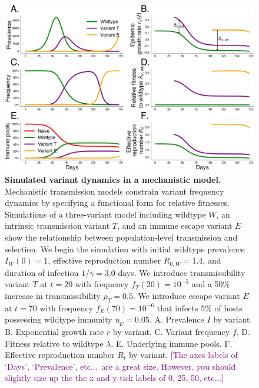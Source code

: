 \documentclass[11pt,oneside,letterpaper]{article}
\newcommand{\wt}{W}
\newcommand{\varEscape}{\eta}
\newcommand{\varTransmission}{\rho}
\def\tbc#1{\textcolor{purple}{[#1]}}
\begin{document}
\begin{figure}[h]
    \centering
    \includegraphics[width=1.0\linewidth]{./figures/vis_mechanisms.png}
    \caption{
      \textbf{Simulated variant dynamics in a mechanistic model.}
      Mechanistic transmission models constrain variant frequency dynamics by specifying a functional form for relative fitnesses.
      Simulations of a three-variant model including wildtype $W$, an intrinsic transmission variant $T$, and an immune escape variant $E$ show the relationship between population-level transmission and selection.
      We begin the simulation with initial wildtype prevalence $I_\wt(0) = 1$, effective reproduction number $R_{0,\wt} = 1.4$, and duration of infection $1/\gamma = 3.0$ days.
      We introduce transmissibility variant $T$ at $t=20$ with frequency $f_T(20) = 10^{-5}$ and a 50\% increase in transmissibility $\varTransmission_T = 0.5$.
      We introduce escape variant $E$ at $t=70$ with frequency $f_E(70) = 10^{-6}$ that infects 5\% of hosts possessing wildtype immunity $\varEscape_E = 0.05$.
      A. Prevalence $I$ by variant.
      B. Exponential growth rate $r$ by variant.
      C. Variant frequency $f$.
      D. Fitness relative to wildtype $\lambda$.
      E. Underlying immune pools.
      F. Effective reproduction number $R_t$ by variant.
      \tbc{The axes labels of `Days', `Prevalence', etc...\ are a great size. However, you should slightly size up the the x and y tick labels of 0, 25, 50, etc...}
    }
    \label{fig:vis_mechanisms}
\end{figure}

\end{document}

